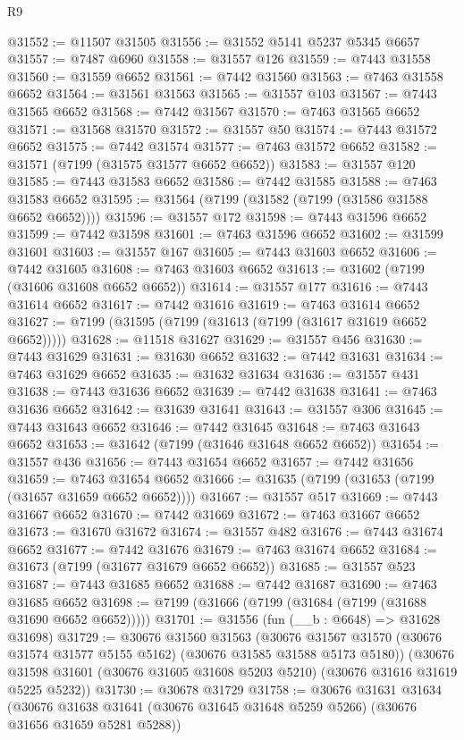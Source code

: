 \begin{lexlean}{R9}
\begin{coremodule}
@31552 := @11507 @31505
@31556 := @31552 @5141 @5237 @5345 @6657
@31557 := @7487 @6960
@31558 := @31557 @126
@31559 := @7443 @31558
@31560 := @31559 @6652
@31561 := @7442 @31560
@31563 := @7463 @31558 @6652
@31564 := @31561 @31563
@31565 := @31557 @103
@31567 := @7443 @31565 @6652
@31568 := @7442 @31567
@31570 := @7463 @31565 @6652
@31571 := @31568 @31570
@31572 := @31557 @50
@31574 := @7443 @31572 @6652
@31575 := @7442 @31574
@31577 := @7463 @31572 @6652
@31582 := @31571 (@7199 (@31575 @31577 @6652 @6652))
@31583 := @31557 @120
@31585 := @7443 @31583 @6652
@31586 := @7442 @31585
@31588 := @7463 @31583 @6652
@31595 := @31564 (@7199 (@31582 (@7199 (@31586 @31588 @6652 @6652))))
@31596 := @31557 @172
@31598 := @7443 @31596 @6652
@31599 := @7442 @31598
@31601 := @7463 @31596 @6652
@31602 := @31599 @31601
@31603 := @31557 @167
@31605 := @7443 @31603 @6652
@31606 := @7442 @31605
@31608 := @7463 @31603 @6652
@31613 := @31602 (@7199 (@31606 @31608 @6652 @6652))
@31614 := @31557 @177
@31616 := @7443 @31614 @6652
@31617 := @7442 @31616
@31619 := @7463 @31614 @6652
@31627 := @7199 (@31595 (@7199 (@31613 (@7199 (@31617 @31619 @6652 @6652)))))
@31628 := @11518 @31627
@31629 := @31557 @456
@31630 := @7443 @31629
@31631 := @31630 @6652
@31632 := @7442 @31631
@31634 := @7463 @31629 @6652
@31635 := @31632 @31634
@31636 := @31557 @431
@31638 := @7443 @31636 @6652
@31639 := @7442 @31638
@31641 := @7463 @31636 @6652
@31642 := @31639 @31641
@31643 := @31557 @306
@31645 := @7443 @31643 @6652
@31646 := @7442 @31645
@31648 := @7463 @31643 @6652
@31653 := @31642 (@7199 (@31646 @31648 @6652 @6652))
@31654 := @31557 @436
@31656 := @7443 @31654 @6652
@31657 := @7442 @31656
@31659 := @7463 @31654 @6652
@31666 := @31635 (@7199 (@31653 (@7199 (@31657 @31659 @6652 @6652))))
@31667 := @31557 @517
@31669 := @7443 @31667 @6652
@31670 := @7442 @31669
@31672 := @7463 @31667 @6652
@31673 := @31670 @31672
@31674 := @31557 @482
@31676 := @7443 @31674 @6652
@31677 := @7442 @31676
@31679 := @7463 @31674 @6652
@31684 := @31673 (@7199 (@31677 @31679 @6652 @6652))
@31685 := @31557 @523
@31687 := @7443 @31685 @6652
@31688 := @7442 @31687
@31690 := @7463 @31685 @6652
@31698 := @7199 (@31666 (@7199 (@31684 (@7199 (@31688 @31690 @6652 @6652)))))
@31701 := @31556 (fun (__b : @6648) => @31628 @31698)
@31729 := @30676
    @31560
    @31563
    (@30676 @31567 @31570 (@30676 @31574 @31577 @5155 @5162) (@30676 @31585 @31588 @5173 @5180))
    (@30676 @31598 @31601 (@30676 @31605 @31608 @5203 @5210) (@30676 @31616 @31619 @5225 @5232))
@31730 := @30678 @31729
@31758 := @30676
    @31631
    @31634
    (@30676 @31638 @31641 (@30676 @31645 @31648 @5259 @5266) (@30676 @31656 @31659 @5281 @5288))

\end{coremodule}
\end{lexlean}
